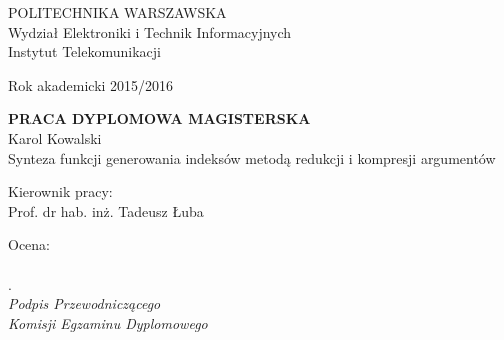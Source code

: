	\newpage
	\thispagestyle{empty}

\begin{flushleft}
	POLITECHNIKA WARSZAWSKA\\
	Wydział Elektroniki i Technik Informacyjnych\\
	Instytut Telekomunikacji\\
\end{flushleft}

\begin{flushright}
	Rok akademicki 2015/2016
\end{flushright}


\begin{center}
	\begin{minipage}{\textwidth}
	\begin{center}
	\Large \textbf{PRACA DYPLOMOWA MAGISTERSKA} \\
	\vspace{15pt}
	\normalsize {Karol Kowalski} \\
	\vspace{15pt}
	\Large {Synteza funkcji generowania indeksów metodą redukcji i kompresji argumentów} \\
	\end{center}
	\end{minipage}
\end{center}


\begin{flushright}
	Kierownik pracy:	\\
	Prof. dr hab. inż. Tadeusz Łuba
\end{flushright}

	\hspace{5pt}

\begin{flushleft}
	\begin{minipage}{7cm}
		Ocena: \dotfill \\
		\\. \dotfill \\[-0.7cm]

		\small\textit{Podpis Przewodniczącego\\ Komisji Egzaminu Dyplomowego}
	\end{minipage}
\end{flushleft}
